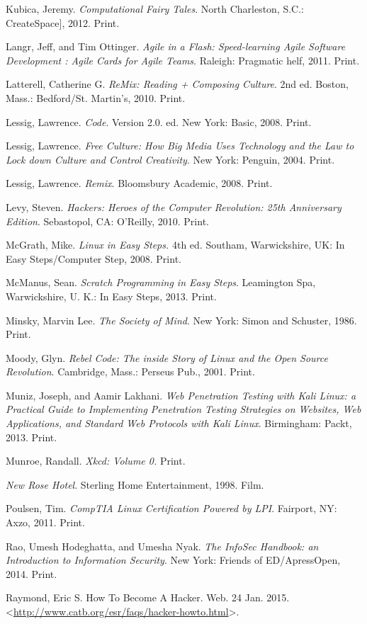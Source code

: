 \documentclass[letterpaper,10pt,english]{sphinxmanual}
\begin{document}
Kubica, Jeremy. \emph{Computational Fairy Tales}. North Charleston, S.C.:
CreateSpace{]}, 2012. Print.

Langr, Jeff, and Tim Ottinger. \emph{Agile in a Flash: Speed-learning Agile
Software Development : Agile Cards for Agile Teams}. Raleigh: Pragmatic
helf, 2011. Print.

Latterell, Catherine G. \emph{ReMix: Reading + Composing Culture}. 2nd ed. Boston, Mass.: Bedford/St. Martin's, 2010. Print.

Lessig, Lawrence. \emph{Code}. Version 2.0. ed. New York: Basic, 2008. Print.

Lessig, Lawrence. \emph{Free Culture: How Big Media Uses Technology and the Law to Lock down Culture and Control Creativity}. New York: Penguin, 2004. Print.

Lessig, Lawrence. \emph{Remix}. Bloomsbury Academic, 2008. Print.

Levy, Steven. \emph{Hackers: Heroes of the Computer Revolution: 25th
Anniversary Edition}. Sebastopol, CA: O'Reilly, 2010. Print.

McGrath, Mike. \emph{Linux in Easy Steps.} 4th ed. Southam, Warwickshire, UK:
In Easy Steps/Computer Step, 2008. Print.

McManus, Sean. \emph{Scratch Programming in Easy Steps}. Leamington Spa,
Warwickshire, U. K.: In Easy Steps, 2013. Print.

Minsky, Marvin Lee. \emph{The Society of Mind}. New York: Simon and Schuster,
1986. Print.

Moody, Glyn. \emph{Rebel Code: The inside Story of Linux and the Open Source
Revolution}. Cambridge, Mass.: Perseus Pub., 2001. Print.

Muniz, Joseph, and Aamir Lakhani. \emph{Web Penetration Testing with Kali Linux: a Practical Guide to Implementing Penetration Testing Strategies on Websites, Web Applications, and Standard Web Protocols with Kali Linux}. Birmingham: Packt, 2013. Print.

Munroe, Randall. \emph{Xkcd: Volume 0.} Print.

\emph{New Rose Hotel}. Sterling Home Entertainment, 1998. Film.

Poulsen, Tim. \emph{CompTIA Linux Certification Powered by LPI}. Fairport, NY:
Axzo, 2011. Print.

Rao, Umesh Hodeghatta, and Umesha Nyak. \emph{The InfoSec Handbook: an Introduction to Information Security}. New York: Friends of ED/ApressOpen, 2014. Print.

Raymond, Eric S. How To Become A Hacker. Web. 24 Jan. 2015. \textless{}\href{http://www.catb.org/esr/faqs/hacker-howto.html}{http://www.catb.org/esr/faqs/hacker-howto.html}\textgreater{}.
\end{document}
